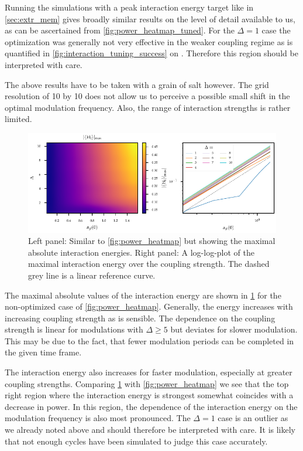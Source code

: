 Running the simulations with a peak interaction energy target like in
\cref{sec:extr_mem} gives broadly similar results on the level of
detail available to us, as can be ascertained from
\cref{fig:power_heatmap_tuned}. For the \(Δ=1\) case the optimization
was generally not very effective in the weaker coupling regime as is
quantified in \cref{fig:interaction_tuning_success} on
. Therefore this region
should be interpreted with care.

The above results have to be taken with a grain of salt however. The
grid resolution of 10 by 10 does not allow us to perceive a possible
small shift in the optimal modulation frequency. Also, the range of
interaction strengths is rather limited.

\begin{figure}[htp]
  \centering
  \includegraphics{figs/one_bath_mod/interaction_nontuned}
  \caption{\label{fig:interaction_nontuned} Left panel: Similar to
    \cref{fig:power_heatmap} but showing the maximal absolute
    interaction energies. Right panel: A log-log-plot of the maximal
    interaction energy over the coupling strength. The dashed grey
    line is a linear reference curve.}
\end{figure}

The maximal absolute values of the interaction energy are shown in
\cref{fig:interaction_nontuned} for the non-optimized case of
\cref{fig:power_heatmap}. Generally, the energy increases with
increasing coupling strength as is sensible. The dependence on the
coupling strength is linear for modulations with \(Δ\geq 5\) but
deviates for slower modulation. This may be due to the fact, that
fewer modulation periods can be completed in the given time frame.

The interaction energy also increases for faster modulation,
especially at greater coupling strengths. Comparing
\cref{fig:interaction_nontuned} with \cref{fig:power_heatmap} we see
that the top right region where the interaction energy is strongest
somewhat coincides with a decrease in power. In this region, the
dependence of the interaction energy on the modulation frequency is
also most pronounced.  The \(Δ=1\) case is an outlier as we already
noted above and should therefore be interpreted with care. It is
likely that not enough cycles have been simulated to judge this case
accurately.

